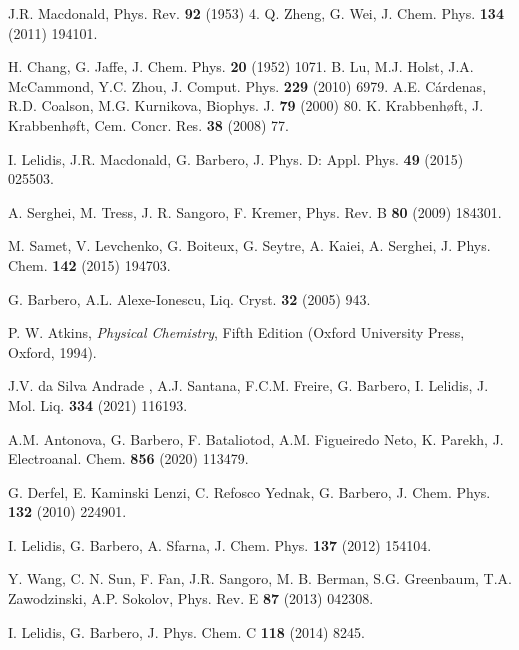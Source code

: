 \documentclass[preprint,aps,pre]{revtex4}
\begin{document}
\begin{thebibliography}{100}

 J.R. Macdonald, Phys. Rev. \textbf{92} (1953) 4.
 Q. Zheng, G. Wei, J. Chem. Phys. \textbf{134} (2011) 194101. 

  H. Chang, G. Jaffe, J. Chem. Phys. \textbf{20} (1952) 1071.
 B. Lu, M.J. Holst, J.A. McCammond, Y.C. Zhou, J. Comput. Phys. \textbf{229} (2010) 6979.
 A.E. C\'{a}rdenas, R.D. Coalson, M.G. Kurnikova, Biophys. J. \textbf{79}  (2000) 80.
 K. Krabbenhøft, J. Krabbenhøft, Cem. Concr. Res. \textbf{38} (2008) 77.

 I. Lelidis, J.R. Macdonald, G. Barbero,
J. Phys. D: Appl. Phys. \textbf{49} (2015) 025503.

 A. Serghei, M. Tress, J. R. Sangoro, F. Kremer,
Phys. Rev. B \textbf{80} (2009) 184301.

 M. Samet, V. Levchenko, G. Boiteux, G. Seytre,
A. Kaiei, A. Serghei, J. Phys. Chem. \textbf{142} (2015) 194703.

 G. Barbero, A.L. Alexe-Ionescu, Liq. Cryst. \textbf{32} (2005) 943.

 P. W. Atkins, \textit{Physical Chemistry}, Fifth Edition (Oxford University Press, Oxford, 1994).

 J.V. da Silva Andrade , A.J. Santana, F.C.M. Freire, G. Barbero, I. Lelidis, J. Mol. Liq. {\bf 334} (2021) 116193.

 A.M. Antonova, G. Barbero, F. Bataliotod, A.M. Figueiredo Neto, K. Parekh, J. Electroanal. Chem. \textbf{856} (2020) 113479.

 G. Derfel, E. Kaminski Lenzi, C. Refosco Yednak, G. Barbero, J. Chem. Phys. {\bf 132} (2010) 224901.

 I. Lelidis, G. Barbero, A. Sfarna, J. Chem. Phys. \textbf{137} (2012) 154104.

 Y. Wang, C. N. Sun, F. Fan, J.R. Sangoro, M. B. Berman, S.G. Greenbaum, T.A. Zawodzinski, A.P. Sokolov, Phys. Rev. E \textbf{87} (2013) 042308.

 I. Lelidis, G. Barbero, J. Phys. Chem. C \textbf{118} (2014) 8245.


\end{thebibliography}
\end{document}
